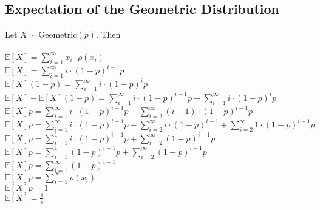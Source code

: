 \documentclass{article}
\begin{document}
		\subsection{Expectation of the Geometric Distribution}
			Let $X \sim \text{Geometric}(p)$. Then \\
			\\
			$\mathbb{E}[X] = \sum_{i=1}^{\infty} x_i \cdot \rho(x_i)$ \\
			$\mathbb{E}[X] = \sum_{i=1}^{\infty} i \cdot (1-p)^{i-1}p$ \\
			$\mathbb{E}[X](1-p) = \sum_{i=1}^{\infty} i \cdot (1-p)^{i}p$ \\
			$\mathbb{E}[X] - \mathbb{E}[X](1-p) = \sum_{i=1}^{\infty} i \cdot (1-p)^{i-1}p - \sum_{i=1}^{\infty} i \cdot (1-p)^{i}p$ \\
			$\mathbb{E}[X]p = \sum_{i=1}^{\infty} i \cdot (1-p)^{i-1}p - \sum_{i=2}^{\infty} (i-1) \cdot (1-p)^{i-1}p$ \\
			$\mathbb{E}[X]p = \sum_{i=1}^{\infty} i \cdot (1-p)^{i-1}p - \sum_{i=2}^{\infty} i \cdot (1-p)^{i-1} + \sum_{i=2}^{\infty} 1 \cdot (1-p)^{i-1}p$ \\
			$\mathbb{E}[X]p = \sum_{i=1}^{1} i \cdot (1-p)^{i-1}p + \sum_{i=2}^{\infty} (1-p)^{i-1}p$ \\
			$\mathbb{E}[X]p = \sum_{i=1}^{1} (1-p)^{i-1}p + \sum_{i=2}^{\infty} (1-p)^{i-1}p$ \\
			$\mathbb{E}[X]p = \sum_{i=1}^{\infty} (1-p)^{i-1}$ \\
			$\mathbb{E}[X]p = \sum_{i=1}^{\infty} \rho(x_i)$ \\
			$\mathbb{E}[X]p = 1$ \\
			$\mathbb{E}[X] = \frac{1}{p}$ \\
			
\end{document}
